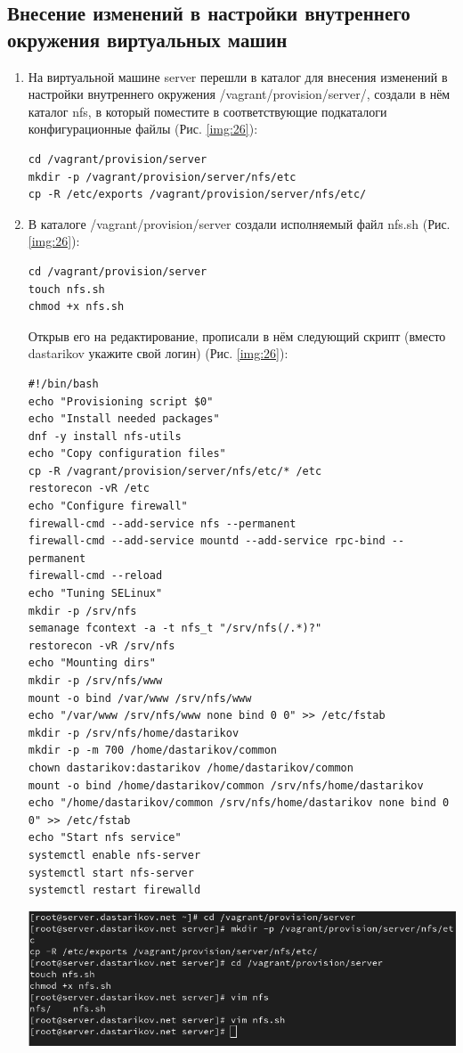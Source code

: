 \subsection{Внесение изменений в настройки внутреннего окружения виртуальных машин}
\begin{enumerate}
\item На виртуальной машине server перешли в каталог для внесения изменений в настройки внутреннего окружения /vagrant/provision/server/, создали в нём каталог nfs, в который поместите в соответствующие подкаталоги конфигурационные файлы (Рис. \ref{img:26}):
    \begin{verbatim}
cd /vagrant/provision/server
mkdir -p /vagrant/provision/server/nfs/etc
cp -R /etc/exports /vagrant/provision/server/nfs/etc/
    \end{verbatim}
\item В каталоге /vagrant/provision/server создали исполняемый файл nfs.sh (Рис. \ref{img:26}):
    \begin{verbatim}
cd /vagrant/provision/server
touch nfs.sh
chmod +x nfs.sh
    \end{verbatim}
Открыв его на редактирование, прописали в нём следующий скрипт (вместо dastarikov укажите свой логин) (Рис. \ref{img:26}):
    \begin{verbatim}
#!/bin/bash
echo "Provisioning script $0"
echo "Install needed packages"
dnf -y install nfs-utils
echo "Copy configuration files"
cp -R /vagrant/provision/server/nfs/etc/* /etc
restorecon -vR /etc
echo "Configure firewall"
firewall-cmd --add-service nfs --permanent
firewall-cmd --add-service mountd --add-service rpc-bind --permanent
firewall-cmd --reload
echo "Tuning SELinux"
mkdir -p /srv/nfs
semanage fcontext -a -t nfs_t "/srv/nfs(/.*)?"
restorecon -vR /srv/nfs
echo "Mounting dirs"
mkdir -p /srv/nfs/www
mount -o bind /var/www /srv/nfs/www
echo "/var/www /srv/nfs/www none bind 0 0" >> /etc/fstab
mkdir -p /srv/nfs/home/dastarikov
mkdir -p -m 700 /home/dastarikov/common
chown dastarikov:dastarikov /home/dastarikov/common
mount -o bind /home/dastarikov/common /srv/nfs/home/dastarikov
echo "/home/dastarikov/common /srv/nfs/home/dastarikov none bind 0 0" >> /etc/fstab
echo "Start nfs service"
systemctl enable nfs-server
systemctl start nfs-server
systemctl restart firewalld
    \end{verbatim}

\begin{center}
    \centering
    \includegraphics[width=\textwidth]{../images/image26.png}
    \label{img:26}
\end{center}


\end{enumerate}

